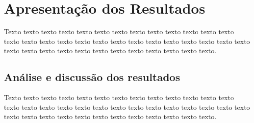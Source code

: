 \chapter{Apresentação dos Resultados}
\label{cap:resultados}

Texto texto texto texto texto texto texto texto texto texto texto texto texto texto texto texto texto texto texto texto texto texto texto texto texto texto texto texto texto texto texto texto texto texto texto texto texto texto texto.

\section{Análise e discussão dos resultados}
\label{sec:discussao-resultados}

Texto texto texto texto texto texto texto texto texto texto texto texto texto texto texto texto texto texto texto texto texto texto texto texto texto texto texto texto texto texto texto texto texto texto texto texto texto texto texto.
